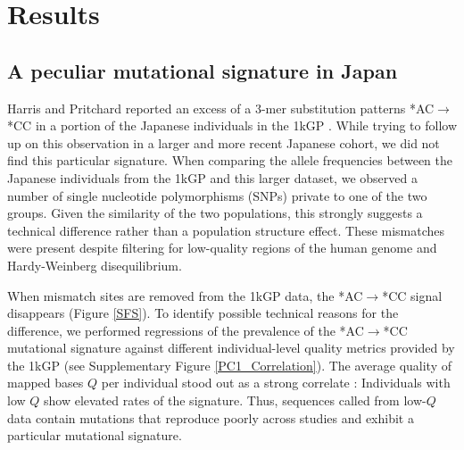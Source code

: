 \documentclass[9pt,lineno]{elife}
\newcommand{\sgcomment}[1]{\textcolor{blue}{SG: #1}}
\begin{document}
\section{Results}

			
\subsection{A peculiar mutational signature in Japan}			
	
Harris and Pritchard reported an excess of a 3-mer substitution patterns *AC${\rightarrow}$*CC in a portion of the Japanese individuals in the 1kGP \citep{Harris2017a}.
While trying to follow up on this observation in a larger and more recent Japanese cohort, we did not find this particular signature.
When comparing the allele frequencies between the Japanese individuals from the 1kGP and this larger dataset, we observed a number of single nucleotide polymorphisms (SNPs) private to one of the two groups.
Given the similarity of the two populations, this strongly suggests a technical difference rather than a population structure effect.
These mismatches were present despite filtering for low-quality regions of the human genome and Hardy-Weinberg disequilibrium. 

When mismatch sites are removed from the 1kGP data, the  *AC${\rightarrow}$*CC signal disappears (Figure \ref{SFS}). To identify possible technical reasons for the difference, we performed regressions of the prevalence of the  *AC${\rightarrow}$*CC mutational signature against different individual-level quality metrics provided by the 1kGP (see Supplementary Figure \ref{PC1_Correlation}). The average quality of mapped bases  $Q$ per individual stood out as a strong correlate : Individuals with low $Q$ show elevated rates of the signature. %
Thus, sequences called from low-$Q$ data contain mutations that reproduce poorly across studies and exhibit a particular mutational signature. 
\end{document}
